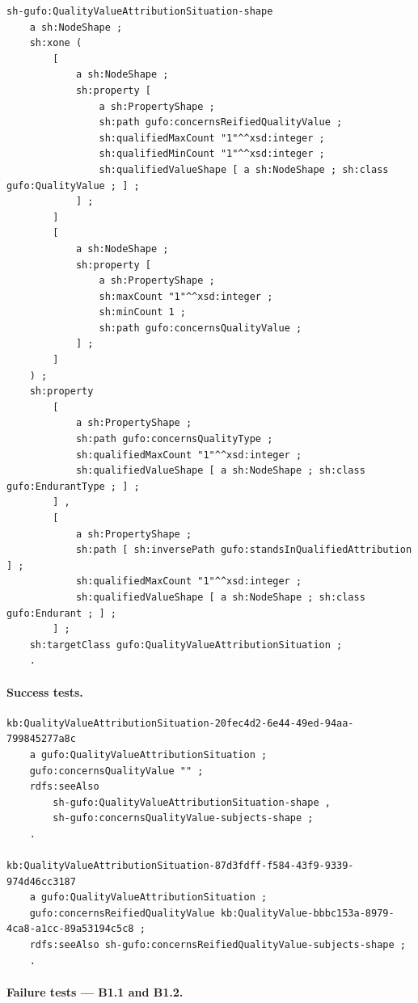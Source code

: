 \documentclass[12pt,a4paper]{article}
\begin{document}
\begin{lstlisting}[style=turtlestyle]
sh-gufo:QualityValueAttributionSituation-shape
    a sh:NodeShape ;
    sh:xone (
        [
            a sh:NodeShape ;
            sh:property [
                a sh:PropertyShape ;
                sh:path gufo:concernsReifiedQualityValue ;
                sh:qualifiedMaxCount "1"^^xsd:integer ;
                sh:qualifiedMinCount "1"^^xsd:integer ;
                sh:qualifiedValueShape [ a sh:NodeShape ; sh:class gufo:QualityValue ; ] ;
            ] ;
        ]
        [
            a sh:NodeShape ;
            sh:property [
                a sh:PropertyShape ;
                sh:maxCount "1"^^xsd:integer ;
                sh:minCount 1 ;
                sh:path gufo:concernsQualityValue ;
            ] ;
        ]
    ) ;
    sh:property
        [
            a sh:PropertyShape ;
            sh:path gufo:concernsQualityType ;
            sh:qualifiedMaxCount "1"^^xsd:integer ;
            sh:qualifiedValueShape [ a sh:NodeShape ; sh:class gufo:EndurantType ; ] ;
        ] ,
        [
            a sh:PropertyShape ;
            sh:path [ sh:inversePath gufo:standsInQualifiedAttribution ] ;
            sh:qualifiedMaxCount "1"^^xsd:integer ;
            sh:qualifiedValueShape [ a sh:NodeShape ; sh:class gufo:Endurant ; ] ;
        ] ;
    sh:targetClass gufo:QualityValueAttributionSituation ;
    .
\end{lstlisting}

\paragraph{Success tests.}

\begin{lstlisting}[style=turtlestyle]
kb:QualityValueAttributionSituation-20fec4d2-6e44-49ed-94aa-799845277a8c
    a gufo:QualityValueAttributionSituation ;
    gufo:concernsQualityValue "" ;
    rdfs:seeAlso
        sh-gufo:QualityValueAttributionSituation-shape ,
        sh-gufo:concernsQualityValue-subjects-shape ;
    .

kb:QualityValueAttributionSituation-87d3fdff-f584-43f9-9339-974d46cc3187
    a gufo:QualityValueAttributionSituation ;
    gufo:concernsReifiedQualityValue kb:QualityValue-bbbc153a-8979-4ca8-a1cc-89a53194c5c8 ;
    rdfs:seeAlso sh-gufo:concernsReifiedQualityValue-subjects-shape ;
    .
\end{lstlisting}

\paragraph{Failure tests --- B1.1 and B1.2.}
\end{document}
